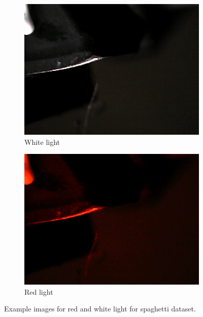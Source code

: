 \begin{figure}[hbtp]
	\centering
	
	\hspace*{\fill}
	\begin{subfigure}{0.4\textwidth}
		\includegraphics[width=\linewidth, keepaspectratio=true]{./fig/Vision/Dataset/automated_datasets/2_created_datasets/2_Spaghetti_dataset/b_003_p_006_l_006-011_white_nb.png}
		\caption{White light}
		\label{fig:impl:datasets:spaghetti:result:white}
	\end{subfigure}
	\hspace*{\fill}
	\begin{subfigure}{0.4\textwidth}
		\includegraphics[width=\linewidth, keepaspectratio=true]{./fig/Vision/Dataset/automated_datasets/2_created_datasets/2_Spaghetti_dataset/b_003_p_006_l_006-011_red_nb.png}
		\caption{Red light}
		\label{fig:impl:datasets:spaghetti:result:red}
	\end{subfigure}
	\hspace*{\fill}
	\caption{Example images for red and white light for spaghetti dataset.}
	\label{fig:impl:datasets:spaghetti:result}
\end{figure}

